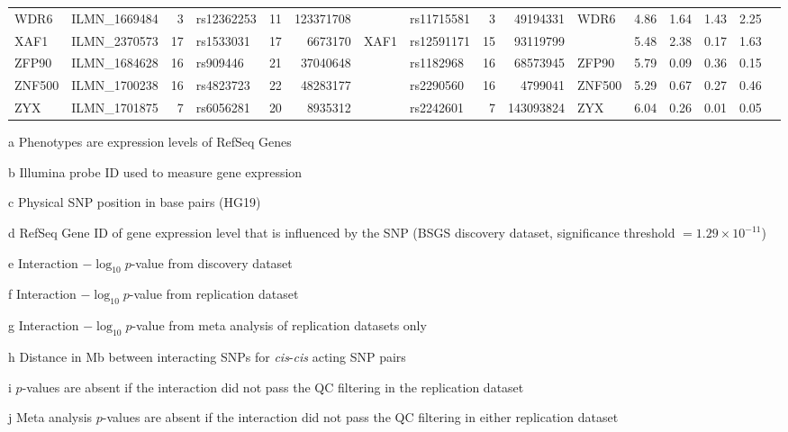 \documentclass{article}
\begin{document}
\begin{landscape}
{\begin{ThreePartTable}
\begin{longtable}{|llr|lrrl|lrrl|rrrr|r|}
WDR6 & ILMN\_1669484 & 3 & rs12362253 & 11 & 123371708 &  & rs11715581 & 3 & 49194331 & WDR6 & 4.86 & 1.64 & 1.43 & 2.25 &  \\
XAF1 & ILMN\_2370573 & 17 & rs1533031 & 17 & 6673170 & XAF1 & rs12591171 & 15 & 93119799 &  & 5.48 & 2.38 & 0.17 & 1.63 &  \\
ZFP90 & ILMN\_1684628 & 16 & rs909446 & 21 & 37040648 &  & rs1182968 & 16 & 68573945 & ZFP90 & 5.79 & 0.09 & 0.36 & 0.15 &  \\
ZNF500 & ILMN\_1700238 & 16 & rs4823723 & 22 & 48283177 &  & rs2290560 & 16 & 4799041 & ZNF500 & 5.29 & 0.67 & 0.27 & 0.46 &  \\
ZYX & ILMN\_1701875 & 7 & rs6056281 & 20 & 8935312 &  & rs2242601 & 7 & 143093824 & ZYX & 6.04 & 0.26 & 0.01 & 0.05 &  \\
\hline
\end{longtable}

\begin{tablenotes}
\item[a] Phenotypes are expression levels of RefSeq Genes
\item[b] Illumina probe ID used to measure gene expression
\item[c] Physical SNP position in base pairs (HG19)
\item[d] RefSeq Gene ID of gene expression level that is influenced by the SNP (BSGS discovery dataset, significance threshold $= 1.29 \times 10^{-11}$)
\item[e] Interaction $-\log_{10} p$-value from discovery dataset
\item[f] Interaction $-\log_{10} p$-value from replication dataset
\item[g] Interaction $-\log_{10} p$-value from meta analysis of replication datasets only
\item[h] Distance in Mb between interacting SNPs for \emph{cis}-\emph{cis} acting SNP pairs
\item[i] $p$-values are absent if the interaction did not pass the QC filtering in the replication dataset
\item[j] Meta analysis $p$-values are absent if the interaction did not pass the QC filtering in either replication dataset

\end{tablenotes}

\end{ThreePartTable}
}
\end{landscape}
\end{document}
